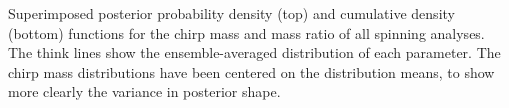 \label{fig:mass_pdfs} Superimposed posterior probability density (top) and cumulative density (bottom) functions for the chirp mass and mass ratio of all spinning analyses.  The think lines show the ensemble-averaged distribution of each parameter.  The chirp mass distributions have been centered on the distribution means, to show more clearly the variance in posterior shape.